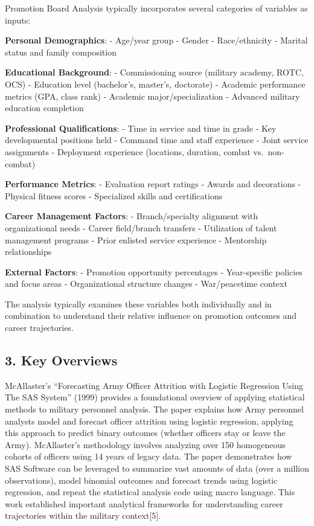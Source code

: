 \documentclass[
  letterpaper,
  DIV=11,
  numbers=noendperiod]{scrartcl}
\begin{document}
Promotion Board Analysis typically incorporates several categories of
variables as inputs:

\textbf{Personal Demographics}: - Age/year group - Gender -
Race/ethnicity - Marital status and family composition

\textbf{Educational Background}: - Commissioning source (military
academy, ROTC, OCS) - Education level (bachelor's, master's, doctorate)
- Academic performance metrics (GPA, class rank) - Academic
major/specialization - Advanced military education completion

\textbf{Professional Qualifications}: - Time in service and time in
grade - Key developmental positions held - Command time and staff
experience - Joint service assignments - Deployment experience
(locations, duration, combat vs.~non-combat)

\textbf{Performance Metrics}: - Evaluation report ratings - Awards and
decorations - Physical fitness scores - Specialized skills and
certifications

\textbf{Career Management Factors}: - Branch/specialty alignment with
organizational needs - Career field/branch transfers - Utilization of
talent management programs - Prior enlisted service experience -
Mentorship relationships

\textbf{External Factors}: - Promotion opportunity percentages -
Year-specific policies and focus areas - Organizational structure
changes - War/peacetime context

The analysis typically examines these variables both individually and in
combination to understand their relative influence on promotion outcomes
and career trajectories.

\subsection{3. Key Overviews}\label{key-overviews}

McAllaster's ``Forecasting Army Officer Attrition with Logistic
Regression Using The SAS System'' (1999) provides a foundational
overview of applying statistical methods to military personnel analysis.
The paper explains how Army personnel analysts model and forecast
officer attrition using logistic regression, applying this approach to
predict binary outcomes (whether officers stay or leave the Army).
McAllaster's methodology involves analyzing over 150 homogeneous cohorts
of officers using 14 years of legacy data. The paper demonstrates how
SAS Software can be leveraged to summarize vast amounts of data (over a
million observations), model binomial outcomes and forecast trends using
logistic regression, and repeat the statistical analysis code using
macro language. This work established important analytical frameworks
for understanding career trajectories within the military
context{[}5{]}.
\end{document}
